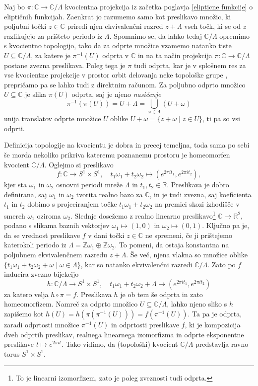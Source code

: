 \documentclass[mat1]{fmfdelo}
\numberwithin{equation}{section}
\newcommand{\R}{\mathbb R}
\newcommand{\Z}{\mathbb Z}
\newcommand{\C}{\mathbb C}
\newcommand{\om}{\omega}
\newcommand{\inv}{^{-1}}
\theoremstyle{definition}
\begin{document}
Naj bo $\pi: \C \to \C/\Lambda$ kvocientna projekcija iz začetka poglavja \ref{elipticne funkcije} o eliptičnih funkcijah. Zaenkrat jo razumemo samo kot preslikavo množic, ki poljubni točki $z \in \C$ priredi njen ekvivalenčni razred $z + \Lambda$ vseh točk, ki se od $z$ razlikujejo za prišteto periodo iz $\Lambda$. Spomnimo se, da lahko tedaj $\C/\Lambda$ opremimo s kvocientno topologijo, tako da za odprte množice vzamemo natanko tiste $U \subseteq \C/\Lambda$, za katere je $\pi\inv (U)$ odprta v $\C$ in na ta način projekcija $\pi:\C \to \C/\Lambda$ postane zvezna preslikava. Poleg tega je $\pi$ tudi odprta, kar je v splošnem res za vse kvocientne projekcije v prostor orbit delovanja neke topološke grupe \cite[trditev 3.42]{MrcunTop}, prepričamo pa se lahko tudi z direktnim računom. Za poljubno odprto množico $U \subseteq \C$ je slika $\pi(U)$ odprta, saj je njeno \emph{nasičenje}
\[
    \pi\inv(\pi(U)) = U + \Lambda = \bigcup_{\om \in \Lambda} (U + \om)
\]
unija translatov odprte množice $U$ oblike $U + \om = \{z + \om \mid z \in U \}$, ti pa so vsi odprti. 

Definicija topologije na kvocientu je dobra in precej temeljna, toda sama po sebi še morda nekoliko prikriva kateremu poznanemu prostoru je homeomorfen kvocient $\C/\Lambda$. Oglejmo si preslikavo 
\[ 
    f: \C \to S^1 \times S^1, \quad t_1\om_1 + t_2\om_2 \mapsto (e^{2 \pi i t_1}, e^{2 \pi i t_2}),
\]
kjer sta $\om_1$ in $\om_2$ osnovni periodi mreže $\Lambda$ in $t_1, t_2 \in \R$. Preslikava je dobro definirana, saj $\om_1$ in $\om_2$ tvorita realno bazo za $\C$, in je tudi zvezna, saj koeficienta $t_1$ in $t_2$ dobimo s projeciranjem točke $t_1\om_1 + t_2\om_2$ na premici skozi izhodišče v smereh $\om_1$ oziroma $\om_2$. Slednje dosežemo z realno linearno preslikavo\footnote{To je linearni izomorfizem, zato je poleg zveznosti tudi odprta.} $\C \to \R^2$, podano s slikama baznih vektorjev $\om_1 \mapsto (1,0)$ in $\om_2 \mapsto (0,1)$. Ključno pa je, da se vrednost preslikave $f$ v dani točki $z \in \C$ ne spremeni, če ji prištejemo katerokoli periodo iz $\Lambda = \Z\om_1 \oplus \Z\om_2$. To pomeni, da ostaja konstantna na poljubnem ekvivalenčnem razredu $z + \Lambda$. Še več, njena vlakna so množice oblike $\{t_1\om_1 + t_2\om_2 + \om \mid \om \in \Lambda\}$, kar so natanko ekvivalenčni razredi $\C/\Lambda$. Zato po \cite[trditev 3.22]{MrcunTop} $f$ inducira zvezno bijekcijo 
\[
    h: \C/\Lambda \to S^1 \times S^1, \quad t_1\om_1 + t_2\om_2 + \Lambda \mapsto (e^{2 \pi i t_1}, e^{2 \pi i t_2})
\]
za katero velja $h \circ \pi = f$. Preslikava $h$ je ob tem še odprta in zato homeomorfizem. Namreč za odprto množico $U\subseteq \C/\Lambda$, lahko njeno sliko s $h$ zapišemo kot $h(U) = h(\pi(\pi\inv(U))) = f(\pi\inv(U))$. Ta pa je odprta, zaradi odprtosti množice $\pi\inv(U)$ in odprtosti preslikave $f$, ki je kompozicija dveh odprtih preslikav, realnega linearnega izomorfizma in odprte eksponentne preslikave $t \mapsto e^{2\pi i t}$. Tako vidimo, da (topološki) kvocient $\C/\Lambda$ predstavlja ravno torus $S^1 \times S^1$.
\end{document}
